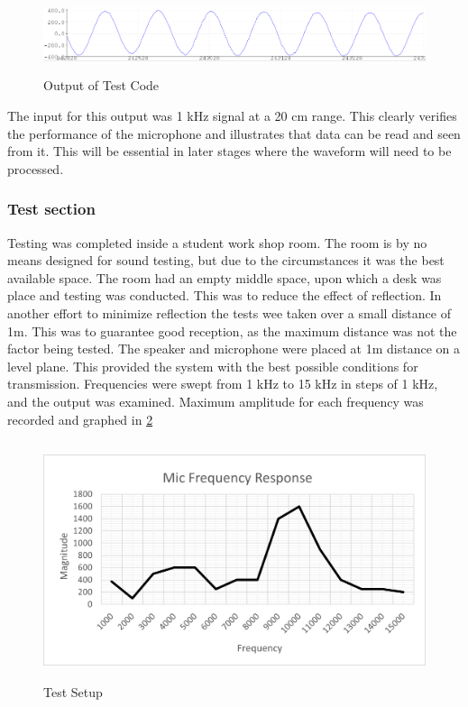 \begin{figure}[H]
\centering
\noindent\includegraphics[width=15.92cm,height=2.27cm]{./images/queueOutput.png}
\caption{Output of Test Code}
\label{fig:qOut}
\end{figure}

The input for this output was 1 kHz signal at a 20 cm range. This clearly verifies the performance of the microphone and illustrates that data can be read and seen from it. This will be essential in later stages where the waveform will need to be processed. 

\subsubsection{Test section}

Testing was completed inside a student work shop room. The room is by no means designed for sound testing, but due to the circumstances it was the best available space. The room had an empty middle space, upon which a desk was place and testing was conducted. This was to reduce the effect of reflection. In another effort to minimize reflection the tests wee taken over a small distance of 1m. This was to guarantee good reception, as the maximum distance was not the factor being tested. The speaker and microphone were placed at 1m distance on a level plane. This provided the system with the best possible conditions for transmission. Frequencies were swept from 1 kHz to 15 kHz in steps of 1 kHz, and the output was examined. Maximum amplitude for each frequency was recorded and graphed in \ref{fig:testResult}

\begin{figure}[H]
\centering
\noindent\includegraphics[width=13.53cm,height=7cm]{./images/testResult.png}
\caption{Test Setup}
\label{fig:testResult}
\end{figure}

